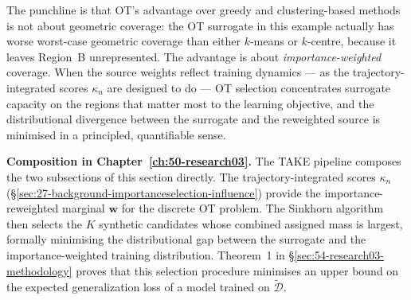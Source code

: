 \begin{foldable}
  The punchline is that \ac{OT}'s advantage over greedy and clustering-based methods is not about geometric coverage: the \ac{OT} surrogate in this example actually has worse worst-case geometric coverage than either $k$-means or $k$-centre, because it leaves Region~B unrepresented.
  The advantage is about \emph{importance-weighted} coverage.
  When the source weights reflect training dynamics --- as the trajectory-integrated scores $\kappa_n$ are designed to do --- \ac{OT} selection concentrates surrogate capacity on the regions that matter most to the learning objective, and the distributional divergence between the surrogate and the reweighted source is minimised in a principled, quantifiable sense.
\end{foldable}

\begin{foldable}
  \textbf{Composition in Chapter~\ref{ch:50-research03}.}
  The TAKE pipeline composes the two subsections of this section directly.
  The trajectory-integrated scores $\kappa_n$ (\S\ref{sec:27-background-importanceselection-influence}) provide the importance-reweighted marginal $\mathbf{w}$ for the discrete OT problem.
  The Sinkhorn algorithm then selects the $K$ synthetic candidates whose combined assigned mass is largest, formally minimising the distributional gap between the surrogate and the importance-weighted training distribution.
  Theorem~1 in \S\ref{sec:54-research03-methodology} proves that this selection procedure minimises an upper bound on the expected generalization loss of a model trained on $\tilde{\mathcal{D}}$.
\end{foldable}
